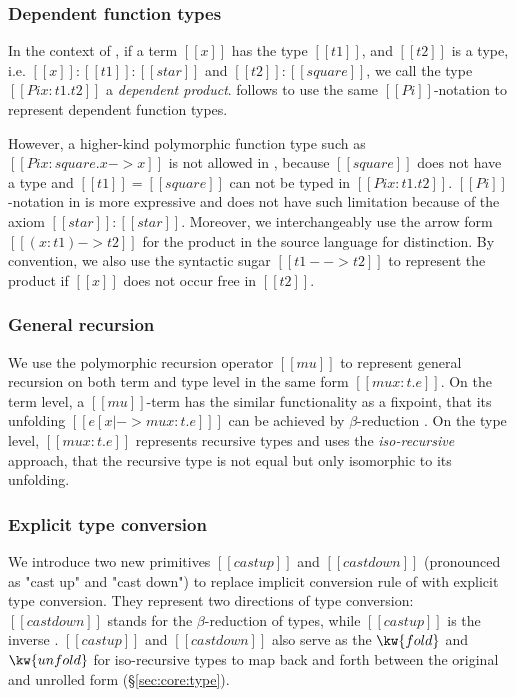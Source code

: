 \subsubsection{Dependent function types}
In the context of \cc, if a term $[[x]]$ has the type $[[t1]]$, and $[[t2]]$ is a type, i.e. $[[x]]:[[t1]]:[[star]]$ and $[[t2]]:[[square]]$, we call the type $[[Pi x:t1.t2]]$ a \emph{dependent product}. \name follows \cc to use the same $[[Pi]]$-notation to represent dependent function types.

However, a higher-kind polymorphic function type such as $[[Pi x:square.x->x]]$ is not allowed in \cc, because $[[square]]$ does not have a type and $[[t1]]=[[square]]$ can not be typed in $[[Pi x:t1.t2]]$.  $[[Pi]]$-notation in \name is more expressive and does not have such limitation because of the axiom $[[star]]:[[star]]$. Moreover, we interchangeably use the arrow form $[[(x:t1)->t2]]$ for the product in the source language for distinction. By convention, we also use the syntactic sugar $[[t1 --> t2]]$ to represent the product if $[[x]]$ does not occur free in $[[t2]]$.

\subsubsection{General recursion}
We use the polymorphic recursion operator $[[mu]]$ to represent general recursion on both term and type level in the same form $[[mu x:t.e]]$. On the term level, a $[[mu]]$-term has the similar functionality as a fixpoint, that its unfolding $[[e [x |-> mu x:t.e] ]]$ can be achieved by $\beta$-reduction . On the type level, $[[mu x:t.e]]$ represents recursive types and uses the \emph{iso-recursive} approach, that the recursive type is not equal but only isomorphic to its unfolding.

\subsubsection{Explicit type conversion}
We introduce two new primitives $[[castup]]$ and $[[castdown]]$ (pronounced as "cast up" and "cast down") to replace implicit conversion rule of \cc with explicit type conversion. They represent two directions of type conversion: $[[castdown]]$ stands for the $\beta$-reduction of types, while $[[castup]]$ is the inverse . $[[castup]]$ and $[[castdown]]$ also serve as the $\kw{fold}$ and $\kw{unfold}$ for iso-recursive types to map back and forth between the original and unrolled form (\S \ref{sec:core:type}).

